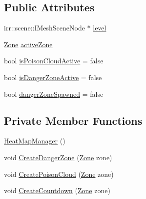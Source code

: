 \subsection*{Public Attributes}
\begin{DoxyCompactItemize}
\item 
irr\-::scene\-::\-I\-Mesh\-Scene\-Node $\ast$ \hyperlink{class_heat_map_manager_a63ca12aefa554bf0756608865f1e1909}{level}
\item 
\hyperlink{class_heat_map_manager_a6d43bc39106e6d2e72437f8902a586b6}{Zone} \hyperlink{class_heat_map_manager_a96bfbcb9d6326e12f37db7a9c4fd1e10}{active\-Zone}
\item 
bool \hyperlink{class_heat_map_manager_affcd194d19a8b51c54bce180d1ca2393}{is\-Poison\-Cloud\-Active} = false
\item 
bool \hyperlink{class_heat_map_manager_aa8c35fb977284623b8399a7150f68cc9}{is\-Danger\-Zone\-Active} = false
\item 
bool \hyperlink{class_heat_map_manager_a9a257b4ffed8cf8c2eaa8c71bf0fa75b}{danger\-Zone\-Spawned} = false
\end{DoxyCompactItemize}
\subsection*{Private Member Functions}
\begin{DoxyCompactItemize}
\item 
\hyperlink{class_heat_map_manager_adc7803f7074083d06bf7f2780a8943ef}{Heat\-Map\-Manager} ()
\item 
void \hyperlink{class_heat_map_manager_a5e270576638ad384789c184b0893c54d}{Create\-Danger\-Zone} (\hyperlink{class_heat_map_manager_a6d43bc39106e6d2e72437f8902a586b6}{Zone} zone)
\item 
void \hyperlink{class_heat_map_manager_a7c87473222fd1fa2acf6672a23f303a2}{Create\-Poison\-Cloud} (\hyperlink{class_heat_map_manager_a6d43bc39106e6d2e72437f8902a586b6}{Zone} zone)
\item 
void \hyperlink{class_heat_map_manager_a9c8819753979c50a6370edbd4fa6f25f}{Create\-Countdown} (\hyperlink{class_heat_map_manager_a6d43bc39106e6d2e72437f8902a586b6}{Zone} zone)
\end{DoxyCompactItemize}
